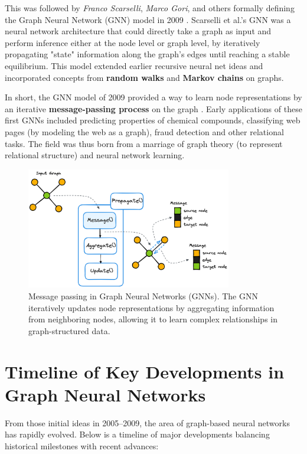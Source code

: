 \documentclass{article}
\begin{document}
This was followed by \textit{Franco Scarselli}, \textit{Marco Gori}, and others formally defining the Graph Neural Network (GNN) model in 2009 \cite{scarselli2009graph}.
Scarselli et al.’s GNN was a neural network architecture that could directly take a graph as input and perform inference either at the node level or graph level, by iteratively propagating "state" information along the graph’s edges until reaching a stable equilibrium.
This model extended earlier recursive neural net ideas and incorporated concepts from \textbf{random walks} and \textbf{Markov chains} on graphs.

In short, the GNN model of 2009 provided a way to learn node representations by an iterative \textbf{message-passing process} on the graph \cite{rizvi2022fimp}.
Early applications of these first GNNs included predicting properties of chemical compounds, classifying web pages (by modeling the web as a graph), fraud detection and other relational tasks.
The field was thus born from a marriage of graph theory (to represent relational structure) and neural network learning.

\begin{figure}[ht]
      \centering
      \includegraphics[width=0.8\textwidth]{../assets/gnn-message-passing.png}
      \caption{Message passing in Graph Neural Networks (GNNs).
            The GNN iteratively updates node representations by aggregating information from neighboring nodes, allowing it to learn complex relationships in graph-structured data.}
      \label{fig:gnn-message-passing}
\end{figure}

\section{Timeline of Key Developments in Graph Neural Networks}

From those initial ideas in 2005–2009, the area of graph-based neural networks has rapidly evolved.
Below is a timeline of major developments balancing historical milestones with recent advances:
\end{document}
